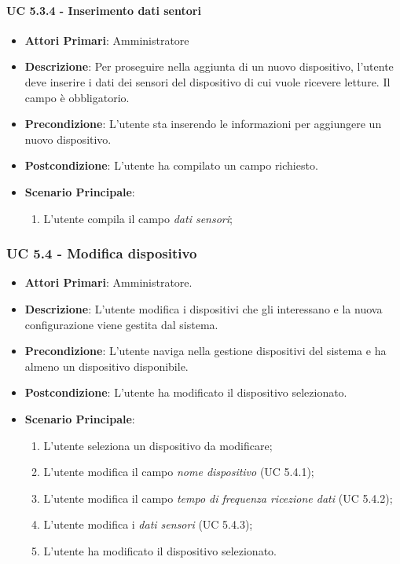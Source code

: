				\paragraph{UC 5.3.4 - Inserimento dati sentori}
				\begin{itemize}
					\item \textbf{Attori Primari}: Amministratore
					\item \textbf{Descrizione}: Per proseguire nella aggiunta di un nuovo dispositivo, l'utente deve inserire i dati dei sensori del dispositivo di cui vuole ricevere letture. Il campo è obbligatorio.
					\item \textbf{Precondizione}: L'utente sta inserendo le informazioni per aggiungere un nuovo dispositivo.
					\item \textbf{Postcondizione}: L'utente ha compilato un campo richiesto.
					\item \textbf{Scenario Principale}:
					\begin{enumerate}
						\item{L'utente compila il campo \textit{dati sensori};}
					\end{enumerate}
				\end{itemize}

			
			\subsubsection{UC 5.4 - Modifica dispositivo}
			\begin{itemize}
				\item \textbf{Attori Primari}: Amministratore.
				\item \textbf{Descrizione}: L'utente modifica i dispositivi che gli interessano e la nuova configurazione viene gestita dal sistema.
				\item \textbf{Precondizione}: L'utente naviga nella gestione dispositivi del sistema e ha almeno un dispositivo disponibile.
				\item \textbf{Postcondizione}: L'utente ha modificato il dispositivo selezionato.
				\item \textbf{Scenario Principale}:
				\begin{enumerate}
					\item{L'utente seleziona un dispositivo da modificare;}
					\item{L'utente modifica il campo \textit{nome dispositivo} (UC 5.4.1);}
					\item{L'utente modifica il campo \textit{tempo di frequenza ricezione dati} (UC 5.4.2);}
					\item{L'utente modifica i \textit{dati sensori} (UC 5.4.3);}
					\item{L'utente ha modificato il dispositivo selezionato.}
				\end{enumerate}
			\end{itemize}


